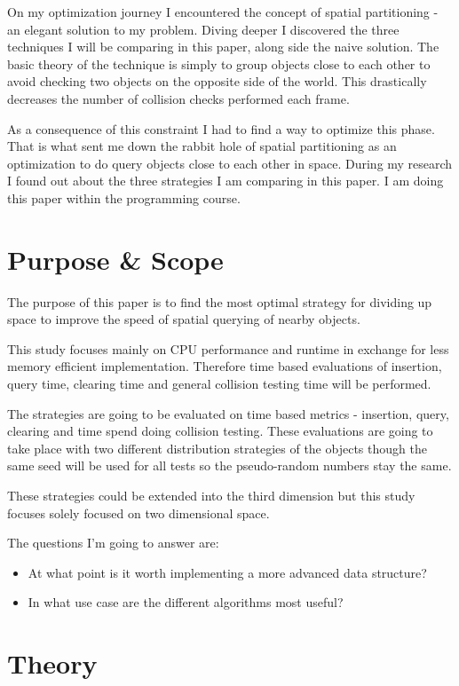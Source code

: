 \documentclass[a4paper, 12pt]{article}
\begin{document}
On my optimization journey I encountered the concept of spatial partitioning -
an elegant solution to my problem. Diving deeper I discovered the three
techniques I will be comparing in this paper, along side the naive solution. The
basic theory of the technique is simply to group objects close to each other to
avoid checking two objects on the opposite side of the world. This drastically
decreases the number of collision checks performed each frame.

As a consequence of this constraint I had to find a way to optimize this phase.
That is what sent me down the rabbit hole of spatial partitioning as an
optimization to do query objects close to each other in space. During my
research I found out about the three strategies I am comparing in this paper. I
am doing this paper within the programming course.

\section{Purpose \& Scope}
The purpose of this paper is to find the most optimal strategy for dividing up
space to improve the speed of spatial querying of nearby objects.

This study focuses mainly on CPU performance and runtime in exchange for less
memory efficient implementation. Therefore time based evaluations of insertion,
query time, clearing time and general collision testing time will be performed.

The strategies are going to be evaluated on time based metrics - insertion,
query, clearing and time spend doing collision testing. These evaluations are
going to take place with two different distribution strategies of the objects
though the same seed will be used for all tests so the pseudo-random numbers
stay the same.

These strategies could be extended into the third dimension but this study
focuses solely focused on two dimensional space.

The questions I'm going to answer are:
\begin{itemize}
    \item At what point is it worth implementing a more advanced data structure?
    \item In what use case are the different algorithms most useful?
\end{itemize}

\section{Theory}
\end{document}
